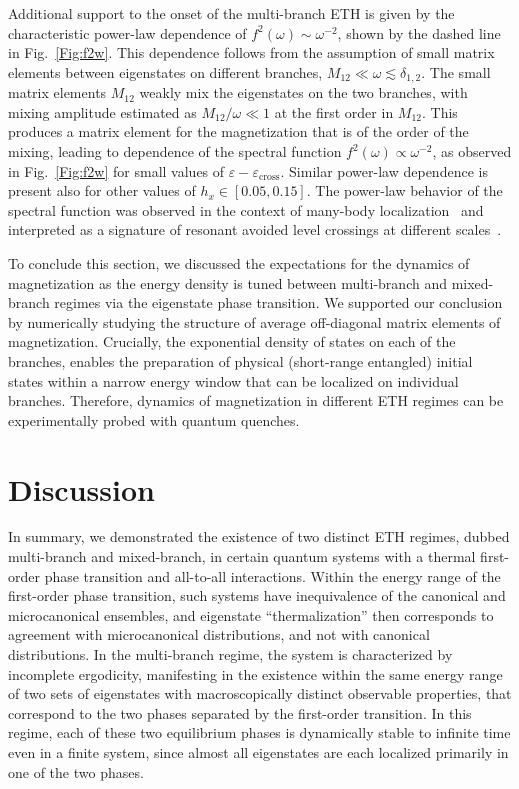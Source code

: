 \documentclass[aps,prx,showpacs,amsmath,amssymb,superscriptaddress,twocolumn,longbibliography,10pt,nofootinbib]{revtex4-2}
\begin{document}
Additional support to the onset of the multi-branch ETH is given by the characteristic power-law dependence of $f^2(\omega)\sim \omega^{-2}$, shown by the dashed line in Fig.~\ref{Fig:f2w}. This dependence follows from the assumption of small matrix elements between eigenstates on different branches, $M_{12}\ll \omega\lesssim\delta_{1,2}$. The small matrix elements $M_{12}$ weakly mix the eigenstates on the two branches, with mixing amplitude estimated as $M_{12}/\omega\ll 1$ at the first order in $M_{12}$. This produces a matrix element for the magnetization that is of the order of the mixing, leading to dependence of the spectral function $f^2(\omega) \propto \omega^{-2}$, as observed in Fig.~\ref{Fig:f2w} for small values of $\varepsilon-\varepsilon_\text{cross}$. Similar power-law dependence is present also for other values of $h_x\in [0.05,0.15]$.
The power-law behavior of the spectral function was observed in the context of many-body localization~\cite{Abanin17,Abanin21} and interpreted as a signature of resonant avoided level crossings at different scales~\cite{Chalker21,Roy22}.

To conclude this section, we discussed the expectations for the dynamics of magnetization as the energy density is tuned between multi-branch and mixed-branch regimes via the eigenstate phase transition.  We supported our conclusion by numerically studying the structure of average off-diagonal matrix elements of magnetization. Crucially, the exponential density of states on each of the branches, enables the preparation of physical (short-range entangled) initial states within a narrow energy window that can be localized on individual branches. Therefore, dynamics of magnetization in different ETH regimes can be experimentally probed with quantum quenches.


\section{Discussion \label{Sec:Discuss}}
In summary, we demonstrated the existence of two distinct ETH regimes, dubbed multi-branch and mixed-branch, in certain quantum systems with a thermal first-order phase transition and all-to-all interactions.  Within the energy range of the first-order phase transition, such systems have inequivalence of the canonical and microcanonical ensembles, and eigenstate ``thermalization'' then corresponds to agreement with microcanonical distributions, and not with canonical distributions.  In the multi-branch regime, the system is characterized by incomplete ergodicity, manifesting in the existence within the same energy range of two sets of eigenstates with macroscopically distinct observable properties, that correspond to the two phases separated by the first-order transition.  In this regime, each of these two equilibrium phases is dynamically stable to infinite time even in a finite system, since almost all eigenstates are each localized primarily in one of the two phases.
\end{document}
